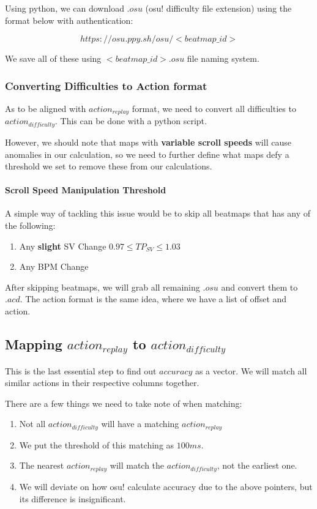 \documentclass{article}
\begin{document}
Using python, we can download $.osu$ (osu! difficulty file extension) using the format below with authentication:

$$https://osu.ppy.sh/osu/<beatmap\_id>$$

We save all of these using $<beatmap\_id>.osu$ file naming system.

\subsubsection{Converting Difficulties to Action format}

As to be aligned with $action_{replay}$ format, we need to convert all difficulties to $action_{difficulty}$. This can be done with a python script.

However, we should note that maps with \textbf{variable scroll speeds} will cause anomalies in our calculation, so we need to further define what maps defy a threshold we set to remove these from our calculations.

\paragraph{Scroll Speed Manipulation Threshold}
A simple way of tackling this issue would be to skip all beatmaps that has any of the following:
\begin{enumerate}
	\item Any \textbf{slight} SV Change $ 0.97 \leq TP_{SV} \leq 1.03 $
	\item Any BPM Change
\end{enumerate}

After skipping beatmaps, we will grab all remaining $.osu$ and convert them to $.acd$. The action format is the same idea, where we have a list of offset and action.

\subsection{Mapping $action_{replay}$ to $action_{difficulty}$}

This is the last essential step to find out $accuracy$ as a vector. We will match all similar actions in their respective columns together.

There are a few things we need to take note of when matching:
\begin{enumerate}
	\item Not all $action_{difficulty}$ will have a matching $action_{replay}$
	\item We put the threshold of this matching as $100ms$.
	\item The nearest $action_{replay}$ will match the $action_{difficulty}$, not the earliest one.
	\item We will deviate on how osu! calculate accuracy due to the above pointers, but its difference is insignificant.
\end{enumerate}
\end{document}
